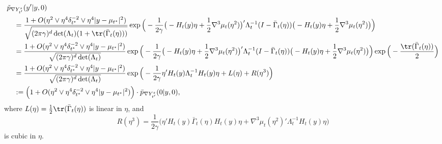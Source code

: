 \documentclass{article}
\begin{document}
	\begin{align}
		& \tilde{p}_{\nabla Y_{t'}^s}(y'|y,0) \\
		& \quad = \frac{1 + O(\eta^2 \vee \eta^4 \delta_{t^*}^{-2} \vee \eta^4 |y  -\mu_{t^*}|^2)}{\sqrt{(2 \pi \gamma)^d \det(\Lambda_t)(1 + \tr(\bar{\Gamma}_t(\eta)))}} \exp\Big(-\frac{1}{2\gamma}\big(-H_t(y)\eta + \frac{1}{2}\nabla^3\mu_t(\eta^2)\big)'\Lambda_{t}^{-1}(I - \bar{\Gamma}_t(\eta))\big(-H_t(y)\eta + \frac{1}{2}\nabla^3\mu_t(\eta^2)\big)\Big) \nonumber \\
		& \quad = \frac{1 + O(\eta^2 \vee \eta^4 \delta_{t^*}^{-2} \vee \eta^4 |y  -\mu_{t^*}|^2)}{\sqrt{(2 \pi \gamma)^d \det(\Lambda_t)}} \exp\Big(-\frac{1}{2\gamma}\big(-H_t(y)\eta + \frac{1}{2}\nabla^3\mu_t(\eta^2)\big)'\Lambda_{t}^{-1}(I - \bar{\Gamma}_t(\eta))\big(-H_t(y)\eta + \frac{1}{2}\nabla^3\mu_t(\eta^2)\big)\Big) \exp\Big(-\frac{\tr(\bar{\Gamma}_t(\eta))}{2}\Big) \nonumber \\
		& \quad = \frac{1 + O(\eta^2 \vee \eta^4 \delta_{t^*}^{-2} \vee \eta^4 |y  -\mu_{t^*}|^2)}{\sqrt{(2 \pi \gamma)^d \det(\Lambda_t)}} \exp\Big(-\frac{1}{2\gamma} \eta' H_{t}(y)\Lambda_t^{-1}H_t(y)\eta + L(\eta) + R(\eta^3)\Big) \nonumber \\
		& \quad := \Big(1 + O(\eta^2 \vee \eta^4 \delta_{t^*}^{-2} \vee \eta^4 |y  -\mu_{t^*}|^2)\Big) \cdot \bar{p}_{\nabla Y_{t'}^s}(0|y,0), \label{eqn:randomized-kac-rice-density-gradient}
	\end{align}
	where $L(\eta) = \frac{1}{2}\tr(\bar{\Gamma}_t(\eta))$ is linear in $\eta$, and 
	$$
	R(\eta^3) = \frac{1}{2\gamma}\Big(\eta'H_{t}(y)\bar{\Gamma}_t(\eta)H_t(y)\eta + \nabla^3\mu_t(\eta^2)'\Lambda_t^{-1}H_t(y)\eta\Big)
	$$ is cubic in $\eta$.
	
\end{document}
